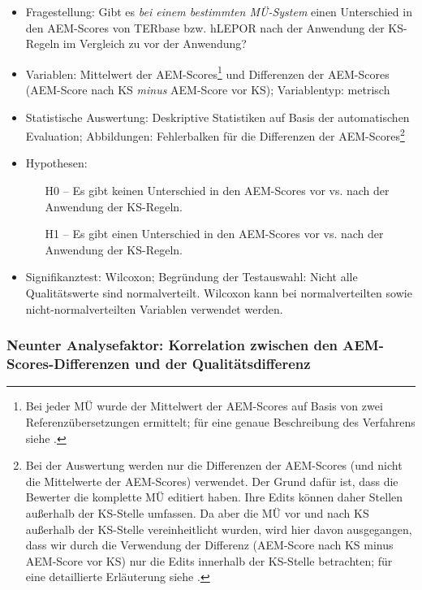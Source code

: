 \begin{itemize}
\item Fragestellung: Gibt es \textit{bei einem bestimmten MÜ-System} einen Unterschied in den AEM-Scores von TERbase bzw. hLEPOR nach der Anwendung der KS-Regeln im Vergleich zu vor der Anwendung?

\item Variablen: Mittelwert der AEM-Scores\footnote{\textrm{Bei jeder MÜ wurde der Mittelwert der AEM-Scores auf Basis von zwei Referenzübersetzungen ermittelt; für eine genaue Beschreibung des Verfahrens siehe .}} und Differenzen der AEM-Scores (AEM-Score nach KS \textit{minus} AEM-Score vor KS); Variablentyp: metrisch

\item Statistische Auswertung: Deskriptive Statistiken auf Basis der automatischen Evaluation; Abbildungen: Fehlerbalken für die Differenzen der AEM-Scores\footnote{\textrm{Bei der Auswertung werden nur die Differenzen der AEM-Scores (und nicht die Mittelwerte der AEM-Scores) verwendet. Der Grund dafür ist, dass die Bewerter die komplette MÜ editiert haben. Ihre Edits können daher Stellen außerhalb der KS-Stelle umfassen. Da aber die MÜ vor und nach KS außerhalb der KS-Stelle vereinheitlicht wurden, wird hier davon ausgegangen, dass wir durch die Verwendung der Differenz (AEM-Score nach KS minus AEM-Score vor KS) nur die Edits innerhalb der KS-Stelle betrachten; für eine detaillierte Erläuterung siehe .}}

\item Hypothesen:

\begin{itemize}

\item[H0 --] Es gibt keinen Unterschied in den AEM-Scores vor vs. nach der Anwendung der KS-Regeln.

\item[H1 --] Es gibt einen Unterschied in den AEM-Scores vor vs. nach der Anwendung der KS-Regeln.

\end{itemize}
\item Signifikanztest: Wilcoxon; Begründung der Testauswahl: Nicht alle Qualitätswerte sind normalverteilt. Wilcoxon kann bei normalverteilten sowie nicht-normalverteilten Variablen verwendet werden.

\end{itemize}

\subsubsection*{Neunter Analysefaktor: Korrelation zwischen den AEM-Scores-Differenzen und der Qualitätsdifferenz}

